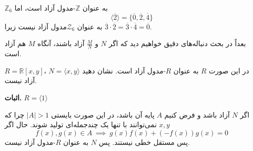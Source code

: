 \begin{frame}
    \begin{example}
        $\mathbb{Z}_6$ به عنوان $\mathbb{Z}$-مدول آزاد است، اما
        \[
            \langle \overline{2} \rangle = \{ \overline{0}, \overline{2} , \overline{4} \}
        \]
        به عنوان \(\mathcal{Z}_6\)مدول آزاد نیست زیرا $\overline{3} \cdot \overline{2} =\overline{3} \cdot \overline{4} = \overline{0}$.

        بعداً در بحث دنباله‌های دقیق
        خواهیم دید
        که اگر
        $N$ و $\frac{M}{N}$ آزاد باشند، آنگاه $M$ هم آزاد است.
    \end{example}

\end{frame}


\begin{frame}
    \begin{example}
        $R = \mathbb{R}[x,y]$، در این صورت $R$ به عنوان $R$-مدول آزاد است. نشان دهید $N = \langle x, y \rangle$ آزاد نیست.



    \end{example}
    \textbf{اثبات.} $R = \langle 1 \rangle$

    اگر $N$ آزاد باشد و فرض کنیم $A$ پایه آن باشد،
    در این صورت
    بایستی
    $|A| > 1$
    چرا که
    $x, y$
    نمی‌توانند
    با تنها یک چندجمله‌ای تولید شوند.
    حال اگر
    \[
        f(x), g(x) \in A \ \implies \ g(x) f(x) + (-f(x)) g(x) = 0
    \]
    پس مستقل خطی نیستند. پس $N$ به عنوان $R$-مدول آزاد نیست.
\end{frame}